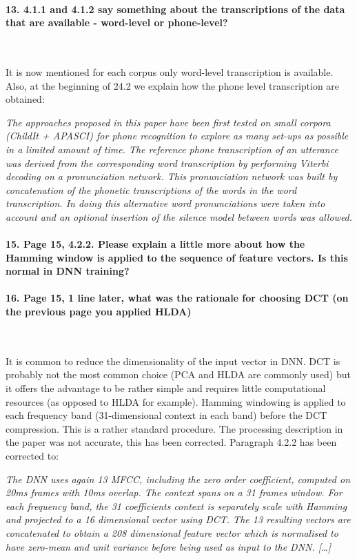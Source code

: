 \documentclass[]{article}
\begin{document}
\paragraph{13. 4.1.1 and 4.1.2 say something about the transcriptions of the data that are available - word-level or phone-level?}

~

It is now mentioned for each corpus only word-level transcription is available. Also, at the beginning of 24.2 we explain how the phone level transcription are obtained:

\textit{The approaches proposed in this paper have been first tested on small
corpora (ChildIt + APASCI) for phone recognition to explore as many
set-ups as possible in a limited amount of time.  The
reference phone transcription of an utterance was derived from the
corresponding word transcription by performing Viterbi decoding on a
pronunciation network.  This pronunciation network was built by
concatenation of the phonetic transcriptions of the words in the word
transcription.  In doing this alternative word pronunciations were
taken into account and an optional insertion of the silence model
between words was allowed.}

\paragraph{15. Page 15, 4.2.2. Please explain a little more about how the Hamming window is applied to the sequence of feature vectors. Is this normal in DNN training?}

\paragraph{16. Page 15, 1 line later, what was the rationale for choosing DCT (on the previous page you applied HLDA)}

~

It is common to reduce the dimensionality of the input vector in DNN. DCT is probably not the most common choice (PCA and HLDA are commonly used) but it offers the advantage to be rather simple and requires little computational resources (as opposed to HLDA for example). Hamming windowing is applied to each frequency band (31-dimensional context in each band) before the DCT compression. This is a rather standard procedure. The processing description in the paper was not accurate, this has been corrected. Paragraph 4.2.2 has been corrected to:

\textit{The DNN  uses again  13 MFCC, including  the zero  order coefficient, computed on 20ms  frames with 10ms overlap. The context spans on a 31 frames  window. For each frequency band, the 31 coefficients context is separately scale with Hamming and projected to a 16 dimensional vector using DCT. The 13 resulting vectors are concatenated to obtain a 208 dimensional feature  vector which is normalised to have zero-mean and unit variance before being used as input to the DNN. [\dots]}
\end{document}
